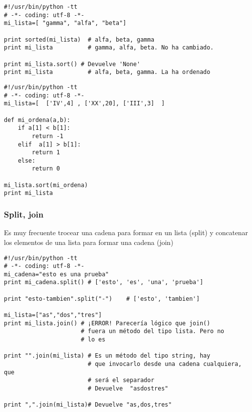 \documentclass[ucs]{beamer}
\begin{document}
\begin{frame}[fragile]

  \begin{footnotesize}
  \begin{verbatim}
#!/usr/bin/python -tt
# -*- coding: utf-8 -*-
mi_lista=[ "gamma", "alfa", "beta"]

print sorted(mi_lista)  # alfa, beta, gamma
print mi_lista          # gamma, alfa, beta. No ha cambiado. 

print mi_lista.sort() # Devuelve 'None'
print mi_lista          # alfa, beta, gamma. La ha ordenado
  \end{verbatim}
  \end{footnotesize}
\end{frame}

\begin{frame}[fragile]

  \begin{footnotesize}
  \begin{verbatim}
#!/usr/bin/python -tt
# -*- coding: utf-8 -*-
mi_lista=[  ['IV',4] , ['XX',20], ['III',3]  ]  

def mi_ordena(a,b):
    if a[1] < b[1]:
        return -1
    elif  a[1] > b[1]:
        return 1
    else:
        return 0

mi_lista.sort(mi_ordena)
print mi_lista
  \end{verbatim}
  \end{footnotesize}
\end{frame}

\begin{frame}[fragile]
\frametitle{Split, join}
Es muy frecuente trocear una cadena para formar en un lista (split) y concatenar los elementos de
una lista para formar una cadena (join)

  \begin{scriptsize}
  \begin{verbatim}
#!/usr/bin/python -tt
# -*- coding: utf-8 -*-
mi_cadena="esto es una prueba"
print mi_cadena.split() # ['esto', 'es', 'una', 'prueba']

print "esto-tambien".split("-")    # ['esto', 'tambien']

mi_lista=["as","dos","tres"]
print mi_lista.join() # ¡ERROR! Parecería lógico que join()
                      # fuera un método del tipo lista. Pero no
                      # lo es

print "".join(mi_lista) # Es un método del tipo string, hay
                        # que invocarlo desde una cadena cualquiera, que
                        # será el separador
                        # Devuelve  "asdostres"

print ",".join(mi_lista)# Devuelve "as,dos,tres"

  \end{verbatim}
  \end{scriptsize}

\end{frame}
\end{document}
